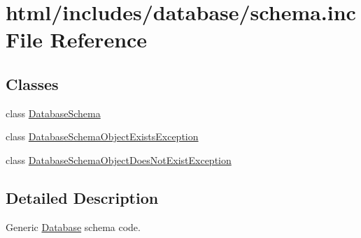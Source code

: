 \hypertarget{schema_8inc}{
\section{html/includes/database/schema.inc File Reference}
\label{schema_8inc}
}
\subsection*{Classes}
\begin{DoxyCompactItemize}
\item 
class \hyperlink{classDatabaseSchema}{DatabaseSchema}
\item 
class \hyperlink{classDatabaseSchemaObjectExistsException}{DatabaseSchemaObjectExistsException}
\item 
class \hyperlink{classDatabaseSchemaObjectDoesNotExistException}{DatabaseSchemaObjectDoesNotExistException}
\end{DoxyCompactItemize}


\subsection{Detailed Description}
Generic \hyperlink{classDatabase}{Database} schema code. 